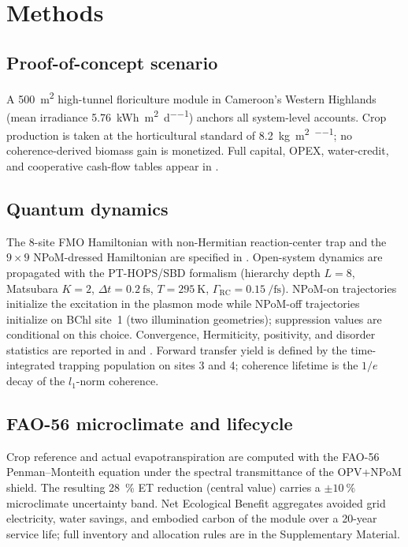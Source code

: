 \documentclass[preprint,12pt]{elsarticle}
\begin{document}

\section{Methods}

\subsection{Proof-of-concept scenario}\label{sec:methods_poc}
A \qty{500}{\m\squared} high-tunnel floriculture module in Cameroon's Western Highlands (mean irradiance \qty{5.76}{\kWh\per\m\squared\per\day}) anchors all system-level accounts. Crop production is taken at the horticultural standard of \qty{8.2}{\kg\per\m\squared\per\yr}; no coherence-derived biomass gain is monetized. Full capital, OPEX, water-credit, and cooperative cash-flow tables appear in .

\subsection{Quantum dynamics}
The 8-site FMO Hamiltonian with non-Hermitian reaction-center trap and the $9\times 9$ NPoM-dressed Hamiltonian are specified in . Open-system dynamics are propagated with the PT-HOPS/SBD formalism (hierarchy depth $L=8$, Matsubara $K=2$, $\Delta t=\qty{0.2}{\fs}$, $T=\qty{295}{\kelvin}$, $\Gamma_{\mathrm{RC}}=\qty{0.15}{\per\fs}$). NPoM-on trajectories initialize the excitation in the plasmon mode while NPoM-off trajectories initialize on BChl site~1 (two illumination geometries); suppression values are conditional on this choice. Convergence, Hermiticity, positivity, and disorder statistics are reported in  and . Forward transfer yield is defined by the time-integrated trapping population on sites 3 and 4; coherence lifetime is the $1/e$ decay of the $l_1$-norm coherence.

\subsection{FAO-56 microclimate and lifecycle}
Crop reference and actual evapotranspiration are computed with the FAO-56 Penman--Monteith equation under the spectral transmittance of the OPV+NPoM shield. The resulting \qty{28}{\percent} ET reduction (central value) carries a $\pm\qty{10}{\percent}$ microclimate uncertainty band. Net Ecological Benefit aggregates avoided grid electricity, water savings, and embodied carbon of the module over a 20-year service life; full inventory and allocation rules are in the Supplementary Material.
\end{document}
